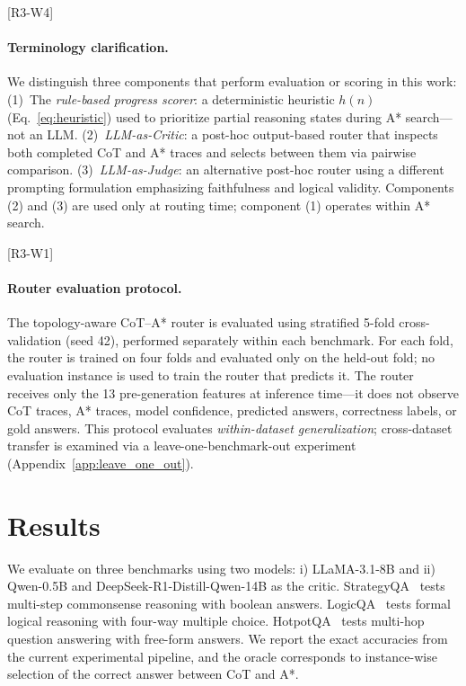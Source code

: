 \documentclass[11pt]{article}
\begin{document}
\textcolor{reviewerpurple}{[R3-W4] \paragraph{Terminology clarification.} We distinguish three components that perform evaluation or scoring in this work: (1)~The \emph{rule-based progress scorer}: a deterministic heuristic $h(n)$ (Eq.~\ref{eq:heuristic}) used to prioritize partial reasoning states during A* search---not an LLM. (2)~\emph{LLM-as-Critic}: a post-hoc output-based router that inspects both completed CoT and A* traces and selects between them via pairwise comparison. (3)~\emph{LLM-as-Judge}: an alternative post-hoc router using a different prompting formulation emphasizing faithfulness and logical validity. Components (2) and (3) are used only at routing time; component (1) operates within A* search.}

\textcolor{reviewerpurple}{[R3-W1] \paragraph{Router evaluation protocol.} The topology-aware CoT--A* router is evaluated using stratified 5-fold cross-validation (seed 42), performed separately within each benchmark. For each fold, the router is trained on four folds and evaluated only on the held-out fold; no evaluation instance is used to train the router that predicts it. The router receives only the 13 pre-generation features at inference time---it does not observe CoT traces, A* traces, model confidence, predicted answers, correctness labels, or gold answers. This protocol evaluates \emph{within-dataset generalization}; cross-dataset transfer is examined via a leave-one-benchmark-out experiment (Appendix~\ref{app:leave_one_out}).}

\section{Results}
\label{sec:results}

We evaluate on three benchmarks using two models: i) LLaMA-3.1-8B and ii) Qwen-0.5B and DeepSeek-R1-Distill-Qwen-14B as the critic. StrategyQA~\cite{geva2021did} tests multi-step commonsense reasoning with boolean answers. LogicQA~\cite{liu2020logiqa} tests formal logical reasoning with four-way multiple choice. HotpotQA~\cite{yang2018hotpotqa} tests multi-hop question answering with free-form answers. We report the exact accuracies from the current experimental pipeline, and the oracle corresponds to instance-wise selection of the correct answer between CoT and A*.
\end{document}
